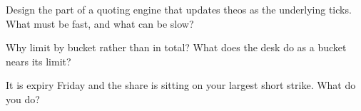 \begin{interviewq}\label{iq:dv:options-market-making-in-practice:4}
Design the part of a quoting engine that updates theos as the underlying ticks. What must be fast, and what can be slow?
\end{interviewq}

\begin{interviewq}\label{iq:dv:options-market-making-in-practice:5}
Why limit  by bucket rather than in total? What does the desk do as a bucket nears its limit?
\end{interviewq}

\begin{interviewq}\label{iq:dv:options-market-making-in-practice:6}
It is expiry Friday and the share is sitting on your largest short strike. What do you do?
\end{interviewq}
